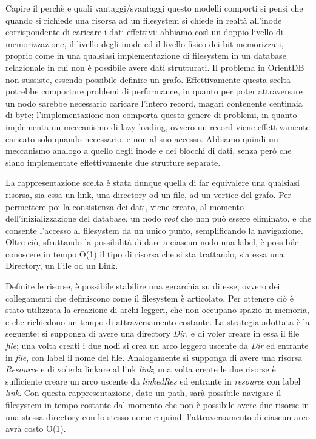 Capire il perchè e quali vantaggi/svantaggi questo modelli comporti si pensi che quando si richiede una risorsa ad un filesystem si chiede in realtà all'inode corrispondente di caricare i dati effettivi: abbiamo così un doppio livello di memorizzazione, il livello degli inode ed il livello fisico dei bit memorizzati, proprio come in una qualsiasi implementazione di filesystem in un database relazionale in cui non è possibile avere dati strutturati. Il problema in OrientDB non sussiste, essendo possibile definire un grafo. Effettivamente questa scelta potrebbe comportare problemi di performance, in quanto per poter attraversare un nodo sarebbe necessario caricare l'intero record, magari contenente centinaia di byte; l'implementazione non comporta questo genere di problemi, in quanto implementa un meccanismo di lazy loading, ovvero un record viene effettivamente caricato solo quando necessario, e non al suo accesso. Abbiamo quindi un meccanismo analogo a quello degli inode e dei blocchi di dati, senza però che siano implementate effettivamente due strutture separate.

 La rappresentazione scelta è stata dunque quella di far equivalere una qualsiasi risorsa, sia essa un link, una directory od un file, ad un vertice del grafo. Per permettere poi la consistenza dei dati, viene creato, al momento dell'inizializzazione del database, un nodo \emph{root} che non può essere eliminato, e che consente l'accesso al filesystem da un unico punto, semplificando la navigazione. Oltre ciò, sfruttando la possibilità di dare a ciascun nodo una label, è possibile conoscere in tempo O(1) il tipo di risorsa che si sta trattando, sia essa una Directory, un File od un Link.
 
 Definite le risorse, è possibile stabilire una gerarchia su di esse, ovvero dei collegamenti che definiscono come il filesystem è articolato. Per ottenere ciò è stato utilizzata la creazione di archi leggeri, che non occupano spazio in memoria, e che richiedono un tempo di attraversamento costante. La strategia adottata è la seguente: si supponga di avere una directory \emph{Dir}, e di voler creare in essa il file \emph{file}; una volta creati i due nodi si crea un arco leggero uscente da \emph{Dir} ed entrante in \emph{file}, con label il nome del file. Analogamente si supponga di avere una risorsa \emph{Resource} e di volerla linkare al link \emph{link}; una volta create le due risorse è sufficiente creare un arco uscente da \emph{linkedRes} ed entrante in \emph{resource} con label \emph{link}. Con questa rappresentazione, dato un path, sarà possibile navigare il filesystem in tempo costante dal momento che non è possibile avere due risorse in una stessa directory con lo stesso nome e quindi l'attraversamento di ciascun arco avrà costo O(1).
 
